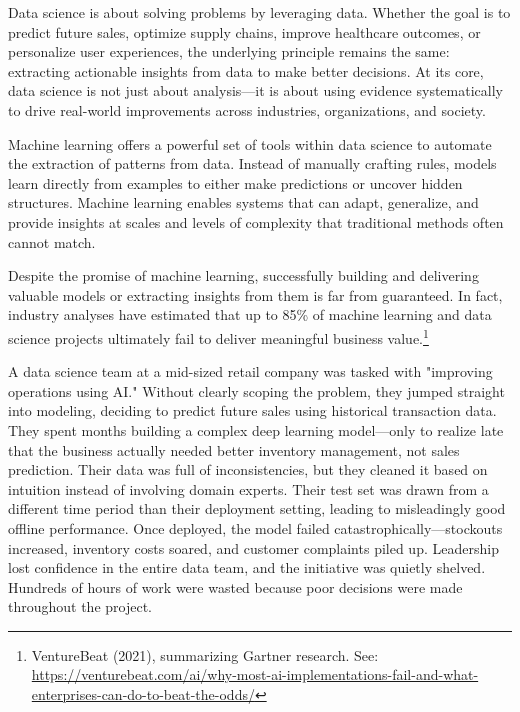 \documentclass[12pt,openany]{book}
\begin{document}
Data science is about solving problems by leveraging data. Whether the goal is to predict future sales, optimize supply chains, improve healthcare outcomes, or personalize user experiences, the underlying principle remains the same: extracting actionable insights from data to make better decisions. At its core, data science is not just about analysis—it is about using evidence systematically to drive real-world improvements across industries, organizations, and society. \newline

Machine learning offers a powerful set of tools within data science to automate the extraction of patterns from data. Instead of manually crafting rules, models learn directly from examples to either make predictions or uncover hidden structures. Machine learning enables systems that can adapt, generalize, and provide insights at scales and levels of complexity that traditional methods often cannot match. \newline

Despite the promise of machine learning, successfully building and delivering valuable models or extracting insights from them is far from guaranteed. In fact, industry analyses have estimated that up to 85\% of machine learning and data science projects ultimately fail to deliver meaningful business value.\footnote{VentureBeat (2021), summarizing Gartner research. See: \url{https://venturebeat.com/ai/why-most-ai-implementations-fail-and-what-enterprises-can-do-to-beat-the-odds/}}

\begin{examplebox}
A data science team at a mid-sized retail company was tasked with "improving operations using AI." Without clearly scoping the problem, they jumped straight into modeling, deciding to predict future sales using historical transaction data. They spent months building a complex deep learning model—only to realize late that the business actually needed better inventory management, not sales prediction. Their data was full of inconsistencies, but they cleaned it based on intuition instead of involving domain experts. Their test set was drawn from a different time period than their deployment setting, leading to misleadingly good offline performance. Once deployed, the model failed catastrophically—stockouts increased, inventory costs soared, and customer complaints piled up. Leadership lost confidence in the entire data team, and the initiative was quietly shelved. Hundreds of hours of work were wasted because poor decisions were made throughout the project.
\end{examplebox}
\end{document}
